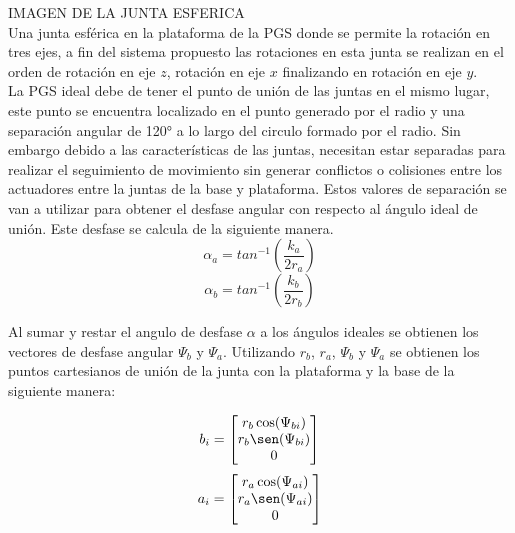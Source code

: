 IMAGEN DE LA JUNTA ESFERICA\\

Una junta esférica en la plataforma de la PGS donde se permite la rotación 
en tres ejes, a fin del sistema propuesto las rotaciones en esta junta se 
realizan en el orden de rotación en eje $z$, rotación en eje $x$ finalizando en 
rotación en eje $y$.\\

La PGS ideal debe de tener el punto de unión de las juntas en el mismo lugar, este 
punto se encuentra localizado en el punto generado por el radio y una separación angular 
de 120° a lo largo del circulo formado por el radio. Sin 
embargo debido a las características de las juntas, necesitan estar separadas para 
realizar el seguimiento de movimiento sin generar conflictos o colisiones entre los 
actuadores entre la juntas de la base y plataforma. Estos valores de separación se van 
a utilizar para obtener el desfase angular con respecto al ángulo ideal de unión. Este 
desfase se calcula de la siguiente manera. \\

\begin{equation} \label{equ:azi-a}
\alpha_a = tan^{-1}\left(\frac{k_a}{2r_a}\right)
\end{equation}
\begin{equation} \label{equ:azi-b}
\alpha_b = tan^{-1}\left(\frac{k_b}{2r_b}\right)
\end{equation}

Al sumar y restar el angulo de desfase $\alpha$ a los ángulos ideales se obtienen 
los vectores de desfase angular $\Psi_b$ y $\Psi_a$. Utilizando $r_b$, $r_a$, 
$\Psi_b$ y $\Psi_a$ se obtienen los puntos cartesianos de unión de la junta 
con la plataforma y la base de la siguiente manera:

\begin{equation} \label{equ:p_b}
b_i = \begin{bmatrix}
r_b\cos(\Psi_{bi})\\
r_b\sen(\Psi_{bi})\\
0\\
\end{bmatrix}
\end{equation}
\begin{equation} \label{equ:p_a}
a_i = \begin{bmatrix}
r_a\cos(\Psi_{ai})\\
r_a\sen(\Psi_{ai})\\
0\\
\end{bmatrix}
\end{equation}

